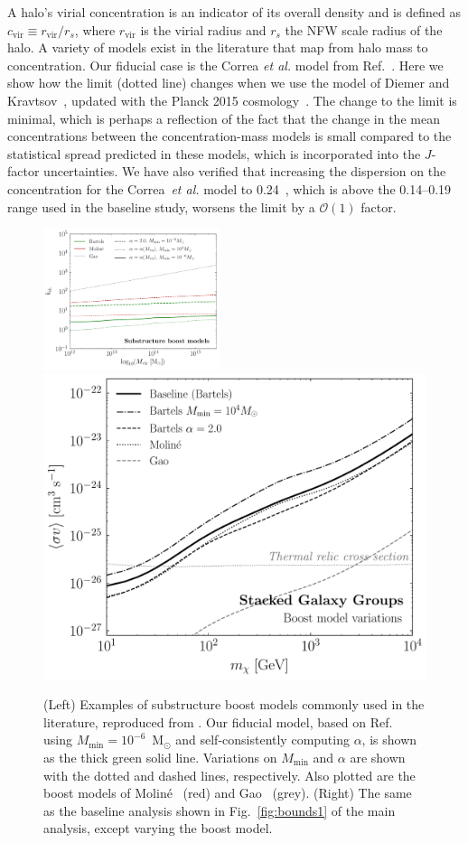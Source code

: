 A halo's virial concentration is an indicator of its overall density and is defined as $c_\text{vir} \equiv r_\text{vir}/r_s$, where $r_\text{vir}$ is the virial radius and $r_s$ the NFW scale radius of the halo.  A variety of models exist in the literature that map from halo mass to concentration.  Our fiducial case is the Correa \emph{et al.} model from Ref.~\cite{Correa:2015dva}.  Here we show how the limit (dotted line) changes when we use the model of Diemer and Kravtsov~\cite{Diemer:2014gba}, updated with the Planck 2015 cosmology~\cite{Ade:2015xua}.  The change to the limit is minimal, which is perhaps a reflection of the fact that the change in the mean concentrations between the concentration-mass models is small compared to the statistical spread predicted in these models, which is incorporated into the $J$-factor uncertainties.  We have also verified that increasing the dispersion on the concentration for the Correa~\emph{et al.} model to 0.24~\cite{Bullock:1999he}, which is above the 0.14--0.19 range used in the baseline study, worsens the limit by a $\mathcal{O}(1)$ factor.\vspace{0.1in}

\begin{figure}[t]
  \centering
  \includegraphics[width=0.46\textwidth]{ch-clusters/plots/boost_models_data.pdf} 
     \includegraphics[width=.45\textwidth]{ch-clusters/plots/systematics_boost.pdf}
  \caption{(Left) Examples of substructure boost models commonly used in the literature, reproduced from \cite{companion}. Our fiducial model, based on Ref.~\cite{Bartels:2015uba} using $M_\text{min} = 10^{-6}$~M$_\odot$ and self-consistently computing $\alpha$, is shown as the thick green solid line. Variations on $M_\text{min}$ and $\alpha$ are shown with the dotted and dashed lines, respectively. Also plotted are the boost models of Molin\'e~\cite{Moline:2016pbm} (red) and Gao~\cite{Gao:2011rf} (grey).  (Right) The same as the baseline analysis shown in Fig.~\ref{fig:bounds1} of the main analysis, except varying the boost model.
  }
  \label{fig:systematics_boost}
\end{figure}

